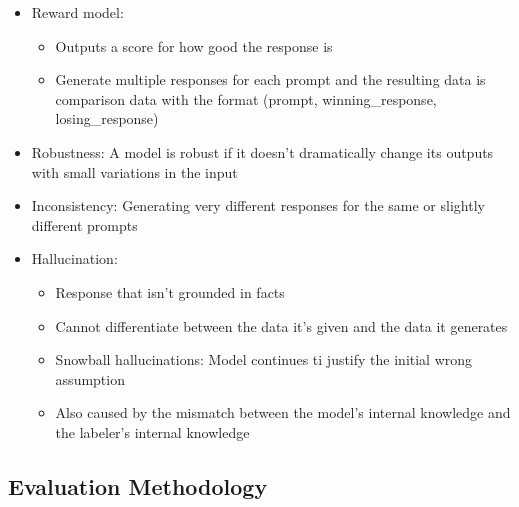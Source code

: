 \documentclass[11pt]{scrartcl}
\begin{document}
\begin{itemize}
	\item Reward model: 
	\begin{itemize}
		\item Outputs a score for how good the response is
		\item Generate multiple responses for each prompt and the resulting data is comparison data with the format (prompt, winning\_response, losing\_response)
	\end{itemize}
	\item Robustness: A model is robust if it doesn't dramatically change its outputs with small variations in the input
	\item Inconsistency: Generating very different responses for the same or slightly different prompts
	\item Hallucination:
	\begin{itemize}
		\item Response that isn't grounded in facts
		\item Cannot differentiate between the data it's given and the data it generates
		\item Snowball hallucinations: Model continues ti justify the initial wrong assumption
		\item Also caused by the mismatch between the model's internal knowledge and the labeler's internal knowledge
	\end{itemize}
\end{itemize}


\subsection*{Evaluation Methodology}
\end{document}
